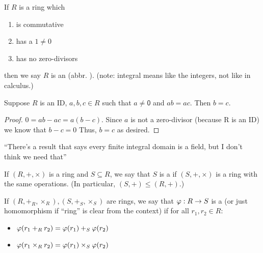 \documentclass[notes.tex]{subfiles}
\begin{document}
\begin{defn}
	If $R$ is a ring which
	\begin{enumerate}
		\item is commutative
		\item has a $1\ne 0$
		\item has no zero-divisors
	\end{enumerate}
	then we say $R$ is an  (abbr. ).
	(note: integral means like the integers, not like in calculus.)
\end{defn}

\begin{proposition}
	Suppose $R$ is an ID, $a,b,c\in R$ such that $a\ne \mathsf0$ and $ab=ac$. Then $b=c$.
\end{proposition}
\begin{proof}
	$0=ab-ac = a(b-c)$. Since $a$ is not a zero-divisor (because R is an ID) we know that $b-c = 0$ Thus, $b=c$ as desired.
\end{proof}

\begin{remark}
	``There's a result that says every finite integral domain is a field, but I don't think we need that''
\end{remark}

\begin{defn}
	If $(R, +, \times)$ is a ring and $S\subseteq R$, we say that $S$ is a  if $(S, +, \times)$ is a ring with the same operations. (In particular, $(S, +) \le (R, +)$.)
\end{defn}

\begin{defn}
	If $(R, +_R, \times_R), (S, +_S, \times_S)$ are rings, we say that $\varphi:R\to S$ is a  (or just homomorphism if ``ring'' is clear from the context) if for all $r_1, r_2\in R$:
	\begin{itemize}
		\item $\varphi(r_1+_Rr_2) = \varphi(r_1) +_S \varphi(r_2)$
		\item $\varphi(r_1\times_R r_2) = \varphi(r_1) \times_S \varphi(r_2)$
	\end{itemize}
\end{defn}
\end{document}
